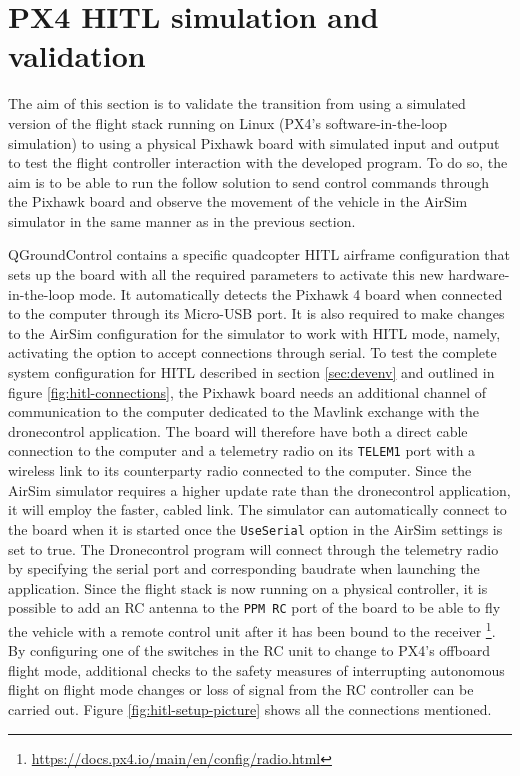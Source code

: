 \section{PX4 HITL simulation and validation}
\label{sec:test-4-hitl}


The aim of this section is to validate the transition from using a simulated version of the flight stack running on Linux (PX4's software-in-the-loop simulation) to using a physical Pixhawk board with simulated input and output to test the flight controller interaction with the developed program.
To do so, the aim is to be able to run the follow solution to send control commands through the Pixhawk board and observe the movement of the vehicle in the AirSim simulator in the same manner as in the previous section.


QGroundControl contains a specific quadcopter HITL airframe configuration that sets up the board with all the required parameters to activate this new hardware-in-the-loop mode.
It automatically detects the Pixhawk 4 board when connected to the computer through its Micro-USB port.
It is also required to make changes to the AirSim configuration for the simulator to work with HITL mode, namely, activating the option to accept connections through serial.
To test the complete system configuration for HITL described in section \ref{sec:devenv} and outlined in figure \ref{fig:hitl-connections}, the Pixhawk board needs an additional channel of communication to the computer dedicated to the Mavlink exchange with the dronecontrol application.
The board will therefore have both a direct cable connection to the computer and a telemetry radio on its \texttt{TELEM1} port with a wireless link to its counterparty radio connected to the computer.
Since the AirSim simulator requires a higher update rate than the dronecontrol application, it will employ the faster, cabled link.
The simulator can automatically connect to the board when it is started once the \texttt{UseSerial} option in the AirSim settings is set to true.
The Dronecontrol program will connect through the telemetry radio by specifying the serial port and corresponding baudrate when launching the application.
Since the flight stack is now running on a physical controller, it is possible to add an RC antenna to the \texttt{PPM RC} port of the board to be able to fly the vehicle with a remote control unit after it has been bound to the receiver \footnote{\url{https://docs.px4.io/main/en/config/radio.html}}.
By configuring one of the switches in the RC unit to change to PX4's offboard flight mode, additional checks to the safety measures of interrupting autonomous flight on flight mode changes or loss of signal from the RC controller can be carried out.
Figure \ref{fig:hitl-setup-picture} shows all the connections mentioned.

